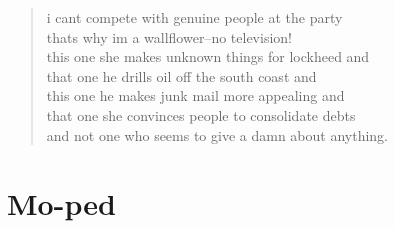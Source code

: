 \documentclass[times,12pt]{book}
\begin{document}
\begin{verse}
i cant compete with genuine people at the party\\
thats why im a wallflower--no television!\\
this one she makes unknown things for lockheed and\\
that one he drills oil off the south coast and\\
this one he makes junk mail more appealing and\\
that one she convinces people to consolidate debts\\
and not one who seems to give a damn about anything.
\end{verse}
\newpage

\section*{Mo-ped}
\end{document}
